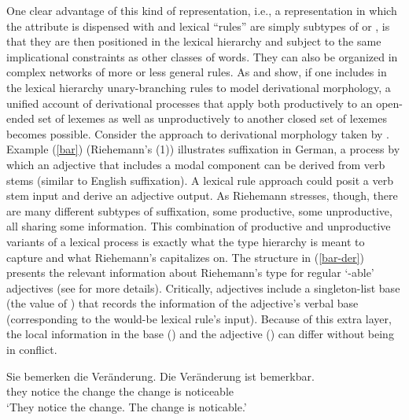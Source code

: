 \documentclass[output=paper
                ,modfonts
                ,nonflat
	        ,collection
	        ,collectionchapter
	        ,collectiontoclongg
 	        ,biblatex
                ,babelshorthands
                ,newtxmath
                ,draftmode
                ,colorlinks, citecolor=brown
]{./langsci/langscibook}
\begin{document}
{One clear advantage of this kind of representation, i.e., a representation in which the attribute  is dispensed with and lexical ``rules'' are simply subtypes of  or , is that they are then positioned in the lexical hierarchy and subject to the same implicational constraints as other classes of words. 
They can also be organized in complex networks of more or less general rules. 
As \citet{Riehemann1998} and \citet{Koenig1999c} show, if one includes in the lexical hierarchy unary-branching rules to model derivational morphology, a unified account of derivational processes that apply both productively to an open-ended set of lexemes as well as unproductively to another closed set of lexemes becomes possible. 
Consider the approach to derivational morphology taken by \citet{Riehemann1998}. 
Example (\ref{bar}) (Riehemann's (1)) illustrates  suffixation   in German, a process by which an adjective that includes a modal component can be derived from verb stems (similar to English  suffixation). 
A lexical rule approach could posit a verb stem input and derive an adjective output. 
As Riehemann stresses, though, there are many different subtypes of  suffixation, some productive, some unproductive, all sharing some information. 
This combination of productive and unproductive variants of a lexical process is exactly what the type hierarchy is meant to capture and what Riehemann's  capitalizes on. 
The structure in (\ref{bar-der}) presents the relevant information about Riehemann's type for regular  `-able' adjectives (see \citealt[68]{Riehemann1998} for more details). 
Critically,  adjectives include a singleton-list base (the value of ) that records the information of the adjective's verbal base (corresponding to the would-be lexical rule's input). 
Because of this extra layer, the local information in the base () and the  adjective () can differ without being in conflict.

\ea
\label{bar}
\gll Sie bemerken die Veränderung. Die Veränderung ist bemerkbar. \\
     they notice the change the change is noticeable \\
\glt `They notice the change. The change is noticable.'
\z

\ea
\label{bar-der}
\z





}
\end{document}
